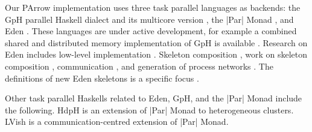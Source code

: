 Our PArrow implementation uses three task parallel languages as backends: the GpH \cite{Trinder1996,Trinder1998a} parallel Haskell dialect and its multicore version \cite{Marlow2009}, the |Par| Monad \cite{par-monad,Foltzer:2012:MPC:2398856.2364562}, and Eden \cite{eden,Loogen2012}. These languages are under active development, for example a combined shared and distributed memory implementation of GpH is available \cite{Aljabri:2013:DIG:2620678.2620682,Aljabri2015}.
Research on Eden includes low-level  implementation \cite{JostThesis,berthold_loidl_hammond_2016}. Skeleton composition \cite{dieterle_horstmeyer_loogen_berthold_2016},
work on skeleton composition \cite{dieterle_horstmeyer_loogen_berthold_2016}, communication \cite{Dieterle2010}, and generation of process networks \cite{Horstmeyer2013}. The definitions of new Eden skeletons is a specific focus \cite{doi:10.1142/S0129626403001380,Eden:PARCO05,Berthold2009-mr,Berthold2009-fft,dieterle2010skeleton,delaEncina2011,Dieterle2013,janjic2013space}.

Other task parallel Haskells related to Eden, GpH, and the |Par| Monad include the following.  
HdpH \cite{Maier:2014:HDS:2775050.2633363,stewart_maier_trinder_2016} is an extension of |Par| Monad to
heterogeneous clusters. LVish \cite{Kuper:2014:TPE:2666356.2594312} is a communication-centred extension
of |Par| Monad.

